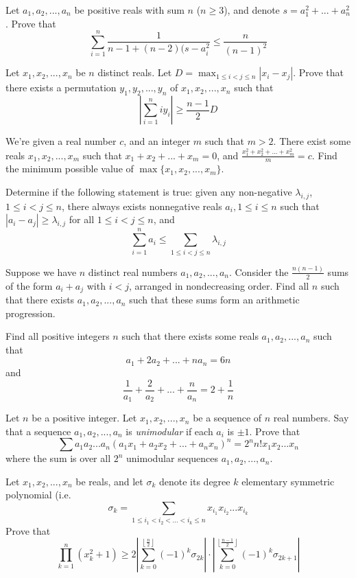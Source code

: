  {Let $a_1,a_2,...,a_n$ be positive reals with sum $n$ ($n\ge 3$), and denote $s=a_1^2+...+a_n^2$. Prove that $$\sum_{i=1}^n \frac{1}{n-1+(n-2)(s-a_i^2} \le \frac{n}{(n-1)^2}$$}

 {Let $x_1,x_2,...,x_n$ be $n$ distinct reals. Let $D=\max_{1\le i<j\le n} |x_i-x_j|$. Prove that there exists a permutation $y_1,y_2,...,y_n$ of $x_1,x_2,...,x_n$ such that $$\left\lvert \sum_{i=1}^n iy_i \right\rvert \ge \frac{n-1}{2}D $$}

 {We're given a real number $c$, and an integer $m$ such that $m>2$. There exist some reals $x_1, x_2, ..., x_m$ such that $x_1 + x_2 + ... + x_m = 0$, and $\frac{x_1^2+x_2^2+...+x_m^2}m=c$. Find the minimum possible value of $\max\{x_1,x_2,...,x_m\}$.}

 {Determine if the following statement is true: given any non-negative $\lambda_{i,j}$, $1\le i<j\le n$, there always exists nonnegative reals $a_i, 1\le i\le n$ such that $|a_i-a_j|\ge \lambda_{i,j}$ for all $1\le i<j\le n$, and $$\sum_{i=1}^n a_i\le \sum_{1\le i<j\le n}\lambda_{i,j}$$}



 {Suppose we have $n$ distinct real numbers $a_1, a_2,..., a_n$. Consider the $\frac{n(n-1)}{2}$ sums of the form $a_i + a_j$ with $i<j$, arranged in nondecreasing order. Find all $n$ such that there exists $a_1, a_2, ..., a_n$ such that these sums form an arithmetic progression.}

 {Find all positive integers $n$ such that there exists some reals $a_1, a_2, ..., a_n$ such that
    \[a_1 + 2a_2 + ... + na_n = 6n\]
    and
    \[\frac1{a_1}+\frac2{a_2}+...+\frac{n}{a_n}=2+\frac1n\]}



 {Let $n$ be a positive integer. Let $x_1, x_2,..., x_n$ be a sequence of $n$ real numbers. Say that a sequence $a_1, a_2,..., a_n$ is
\textit{unimodular} if each $a_i$ is $\pm 1$. Prove that $$\sum a_1a_2...a_n(a_1x_1+a_2x_2+...+a_nx_n)^n= 2^nn!x_1x_2...x_n$$ where the sum is over all $2^n$ unimodular sequences $a_1,a_2,...,a_n$.}

 {Let $x_1,x_2,...,x_n$ be reals, and let $\sigma_k$ denote its degree $k$ elementary symmetric polynomial (i.e. $$\sigma_k=\sum_{1\le i_1<i_2<...<i_k\le n} x_{i_1}x_{i_2}...x_{i_k}$$
Prove that $$\prod_{k=1}^n (x_k^2+1) \ge 2\left\lvert \sum_{k=0}^{\left\lfloor \frac{n}{2}\right\rfloor} (-1)^k\sigma_{2k} \right\rvert\cdot \left\lvert \sum_{k=0}^{\left\lfloor \frac{n-1}{2}\right\rfloor} (-1)^k\sigma_{2k+1} \right\rvert$$}


